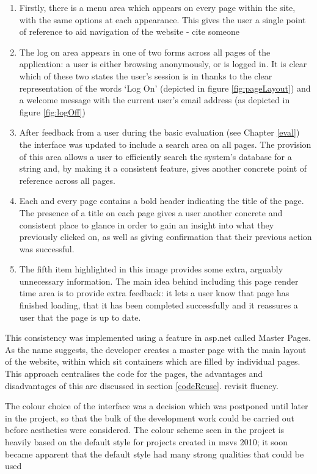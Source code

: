\begin{enumerate}
	\item Firstly, there is a menu area which appears on every page within the site, with the same options at each appearance.  This gives the user a single point of reference to aid navigation of the website \revisit - cite someone
	\item The log on area appears in one of two forms across all pages of the application: a user is either browsing anonymously, or is logged in.  It is clear which of these two states the user's session is in thanks to the clear representation of the words `Log On' (depicted in figure \ref{fig:pageLayout}) and a welcome message with the current user's email address (as depicted in figure \ref{fig:logOff})
	\item After feedback from a user during the basic evaluation (see Chapter \ref{eval}) the interface was updated to include a search area on all pages.  The provision of this area allows a user to efficiently search the system's database for a string and, by making it a consistent feature, gives another concrete point of reference across all pages.
	\item Each and every page contains a bold header indicating the title of the page.  The presence of a title on each page gives a user another concrete and consistent place to glance in order to gain an insight into what they previously clicked on, as well as giving confirmation that their previous action was successful.
	\item The fifth item highlighted in this image provides some extra, arguably unnecessary information.  The main idea behind including this page render time area is to provide extra feedback: it lets a user know that page has finished loading, that it has been completed successfully and it reassures a user that the page is up to date.
\end{enumerate}

This consistency was implemented using a feature in \gls{asp}.\gls{net} called Master Pages.  As the name suggests, the developer creates a master page with the main layout of the website, within which sit containers which are filled by individual pages.  This approach centralises the code for the pages, the advantages and disadvantages of this are discussed in section \ref{codeReuse}. \revisit revisit fluency.

The colour choice of the interface was a decision which was postponed until later in the project, so that the bulk of the development work could be carried out before aesthetics were considered.  The colour scheme seen in the project is heavily based on the default style for projects created in \gls{msvs} 2010; it soon became apparent that the default style had many strong qualities that could be used 

